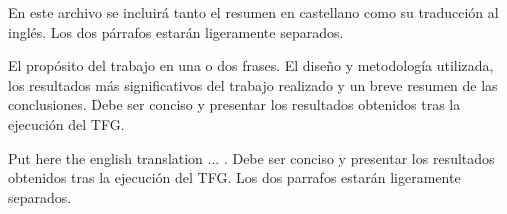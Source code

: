 En este archivo se incluirá tanto el resumen en castellano como su traducción al inglés. Los dos párrafos estarán ligeramente separados.

El  propósito  del  trabajo  en  una  o  dos  frases.  El  diseño  y metodología  utilizada,  los  resultados  más  significativos  del trabajo realizado y un breve resumen de las conclusiones. Debe ser conciso y presentar los resultados obtenidos tras la ejecución del TFG. 

\vspace{1.5cm}

Put here  the english translation  ... . Debe ser conciso y presentar los resultados obtenidos tras la ejecución del TFG. Los dos parrafos estarán ligeramente separados.